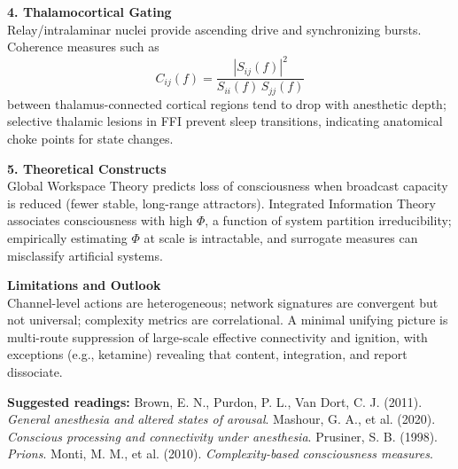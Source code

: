 \begin{technical}
    \textbf{4. Thalamocortical Gating}\\[0.3em]
    Relay/intralaminar nuclei provide ascending drive and synchronizing bursts. Coherence measures such as
    \[
        C_{ij}(f) = \frac{|S_{ij}(f)|^2}{S_{ii}(f)\,S_{jj}(f)}
    \]
    between thalamus-connected cortical regions tend to drop with anesthetic depth; selective thalamic lesions in FFI prevent sleep transitions, indicating anatomical choke points for state changes.

    \textbf{5. Theoretical Constructs}\\[0.3em]
    Global Workspace Theory predicts loss of consciousness when broadcast capacity is reduced (fewer stable, long-range attractors). Integrated Information Theory associates consciousness with high $\Phi$, a function of system partition irreducibility; empirically estimating $\Phi$ at scale is intractable, and surrogate measures can misclassify artificial systems.

    \textbf{Limitations and Outlook}\\[0.3em]
    Channel-level actions are heterogeneous; network signatures are convergent but not universal; complexity metrics are correlational. A minimal unifying picture is multi-route suppression of large-scale effective connectivity and ignition, with exceptions (e.g., ketamine) revealing that content, integration, and report dissociate.

    \vspace{0.5em}
    \textbf{Suggested readings:}\newline
    Brown, E. N., Purdon, P. L., Van Dort, C. J. (2011). \emph{General anesthesia and altered states of arousal}.\newline
    Mashour, G. A., et al. (2020). \emph{Conscious processing and connectivity under anesthesia}.\newline
    Prusiner, S. B. (1998). \emph{Prions}.\newline
    Monti, M. M., et al. (2010). \emph{Complexity-based consciousness measures}.
\end{technical}
